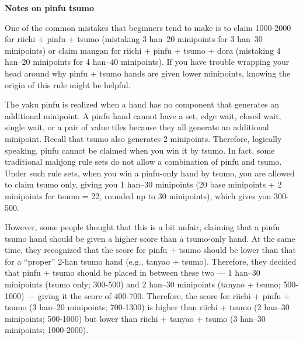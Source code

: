 \newpage
\begin{boxnote} \small
{\bf\normalsize Notes on {\jap pinfu tsumo}}
\bigskip

One of the common mistakes that beginners tend to make is to claim 1000-2000 for riichi + {\jap pinfu + tsumo} (mistaking 3 {\jap han}--20 minipoints for 3 {\jap han}--30 minipoints) or claim {\jap mangan} for riichi + {\jap pinfu + tsumo + dora} (mistaking 4 {\jap han}--20 minipoints for 4 {\jap han}--40 minipoints).
If you have trouble wrapping your head around why {\jap pinfu + tsumo} hands are given lower minipoints, knowing the origin of this rule might be helpful.
\bigskip

The {\jap yaku} {\jap pinfu} is realized when a hand has no component that generates an additional minipoint. A {\jap pinfu} hand cannot have a set, edge wait, closed wait, single wait, or a pair of value tiles because they all generate an additional minipoint. Recall that {\jap tsumo} also generates 2 minipoints. Therefore, logically speaking, {\jap pinfu} cannot be claimed when you win it by {\jap tsumo}. In fact, some traditional mahjong rule sets do not allow a combination of {\jap pinfu} and {\jap tsumo}.
Under such rule sets, when you win a {\jap pinfu}-only hand by {\jap tsumo}, you are allowed to claim {\jap tsumo} only, giving you 1 {\jap han}--30 minipoints (20 base minipoints + 2 minipoints for {\jap tsumo} = 22, rounded up to 30 minipoints), which gives you 300-500.

%
%
\bigskip
However, some people thought that this is a bit unfair, claiming that a {\jap pinfu tsumo} hand should be given a higher score than a {\jap tsumo}-only hand. At the same time, they recognized that the score for {\jap pinfu + tsumo} should be lower than that for a ``proper'' 2-{\jap han} {\jap tsumo} hand (e.g., {\jap tanyao + tsumo}).
Therefore, they decided that {\jap pinfu + tsumo} should be placed in between these two --- 1 {\jap han}--30 minipoints ({\jap tsumo} only; 300-500) and 2 {\jap han}--30 minipoints ({\jap tanyao + tsumo}; 500-1000) --- giving it the score of 400-700. Therefore, the score for riichi + {\jap pinfu + tsumo} (3 {\jap han}--20 minipoints; 700-1300) is higher than riichi + {\jap tsumo} (2 {\jap han}--30 minipoints; 500-1000) but lower than riichi + {\jap tanyao + tsumo} (3 {\jap han}--30 minipoints; 1000-2000).
\end{boxnote}

